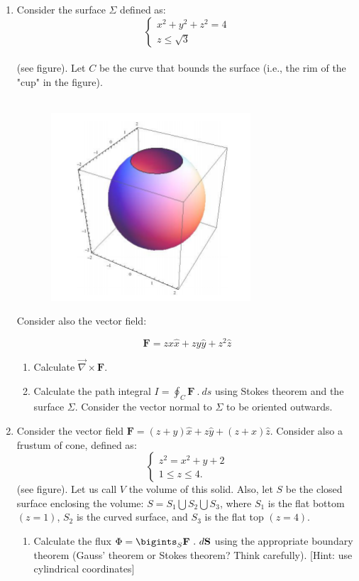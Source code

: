 \documentclass[fleqn]{article}
\begin{document}
  \begin{enumerate}
    \item Consider the surface $\Sigma$ defined as: \\
      $$\begin{cases}
        x^2+y^2+z^2=4 \\
        z \leq \sqrt{3}
      \end{cases}$$ \\
      (see figure). Let $C$ be the curve that bounds the surface (i.e., the rim of the "cup" in the figure). \\
      \\
      \begin{center}
        \includegraphics[height=7cm, width=10cm]{first.png}
      \end{center}

      Consider also the vector field:

      $$\mathbf{F}=zx \hat{x}+zy \hat{y}+z^2 \hat{z}$$
      \begin{enumerate}
        \item Calculate $\overrightarrow{\nabla} \times \mathbf{F}$.
        
        \item Calculate the path integral $I=\oint_C \mathbf{F} ~ . ~ ds$ using Stokes theorem and the surface $\Sigma$.
        Consider the vector normal to $\Sigma$ to be oriented outwards.
      \end{enumerate}

    \item Consider the vector field $\mathbf{F}=(z+y) \hat{x}+z\hat{y}+(z+x)\hat{z}$. Consider also a frustum of cone, defined as:
    $$\begin{cases}
      z^2=x^2+y+2 \\
      1\leq z \leq 4.
    \end{cases}$$ 
    (see figure). Let us call $V$ the volume of this solid. Also, let $S$ be the closed surface enclosing the volume:
    $S=S_1\bigcup S_2 \bigcup S_3$, where $S_1$ is the flat bottom $(z=1)$, $S_2$ is the curved surface, and $S_3$ is the flat top $(z=4)$.
    \begin{enumerate}
      \item Calculate the flux $\Phi=\bigints_S \mathbf{F} ~ . ~ d\mathbf{S}$ using the appropriate boundary theorem (Gauss’
      theorem or Stokes theorem? Think carefully). [Hint: use cylindrical coordinates]
      

\end{enumerate}
\end{enumerate}
\end{document}
